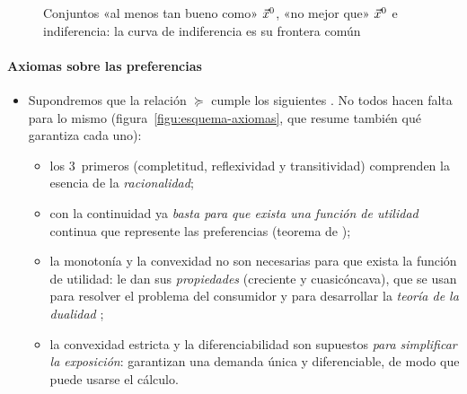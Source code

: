 \documentclass[11pt]{article}
\begin{document}
\begin{figure}[H]
\centering
\caption{Conjuntos «al menos tan bueno como» $\vec{x}^0$, «no mejor que» $\vec{x}^0$ e indiferencia: la curva de indiferencia es su frontera común}\label{fig:conjuntos-contorno}
\end{figure}

\paragraph{Axiomas sobre las preferencias}

\begin{itemize}
\item Supondremos que la relación $\succcurlyeq$ cumple los siguientes \nocite{Debreu1959Theory,MasColellWhinstonGreen1995}. No todos hacen falta para lo mismo (figura~\ref{figu:esquema-axiomas}, que resume también qué garantiza cada uno):
  \begin{itemize}
  \item los 3~primeros (completitud, reflexividad y transitividad) comprenden la esencia de la \emph{racionalidad};
  \item con la continuidad ya \emph{basta para que exista una función de utilidad} continua que represente las preferencias (teorema de );
  \item la monotonía y la convexidad no son necesarias para que exista la función de utilidad: le dan sus \emph{propiedades} (creciente y cuasicóncava), que se usan para resolver el problema del consumidor y para desarrollar la \emph{teoría de la dualidad} ;
  \item la convexidad estricta y la diferenciabilidad son supuestos \emph{para simplificar la exposición}: garantizan una demanda única y diferenciable, de modo que puede usarse el cálculo.
  \end{itemize}
\end{itemize}

\begin{infografia}[H]
\centering
\caption{Axiomas sobre las preferencias: qué garantiza cada uno y cómo se agrupan según su papel}\label{figu:esquema-axiomas}
\end{infografia}
\end{document}
